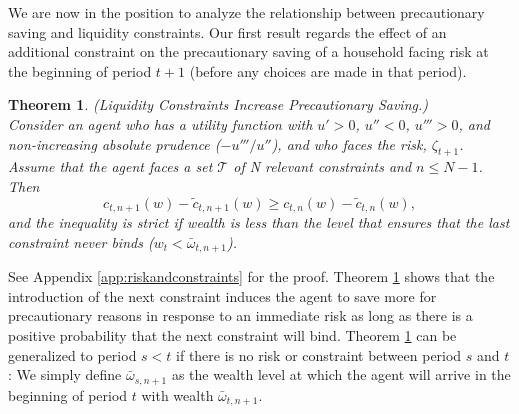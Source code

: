 \documentclass[titlepage]{\econtex}
\providecommand{\wAlt}{\omega}
\newtheorem{theorem}{Theorem}
\begin{document}
  We are now in the position to analyze the relationship between precautionary saving and liquidity constraints. Our first result regards the effect of an additional constraint on the precautionary saving of a household facing risk at the beginning of period $t+1$ (before any choices are made in that period).

  \begin{theorem}\label{thm:riskandconstraints} (Liquidity Constraints Increase Precautionary Saving.) \\
    Consider an agent who has a utility function with $u'> 0$, $u''< 0$, $u''' > 0$, and non-increasing absolute prudence ($-u'''/u''$), and who faces the risk, $\zeta_{t+1}$. Assume that the agent faces a set $\mathcal{T}$ of N relevant constraints and $n \leq N-1$. Then
    \begin{equation}
      c_{t,n+1}(w) - \tilde{c}_{t,n+1}(w) \geq c_{t,n}(w)-\tilde{c}_{t,n}(w), \label{eq:ineq}
    \end{equation}
    and the inequality is strict if wealth is less than the level that ensures that the last constraint never binds ($w_t < \bar{\wAlt}_{t,n+1}$).
  \end{theorem}

  \noindent See Appendix \ref{app:riskandconstraints} for the proof. Theorem \ref{thm:riskandconstraints} shows that the introduction of the next constraint induces the agent to save more for precautionary reasons in response to an immediate risk as long as there is a positive probability that the next constraint will bind. Theorem \ref{thm:riskandconstraints} can be generalized to period $s < t$ if there is no risk or constraint between period $s$ and $t$: We simply define $\bar{\wAlt}_{s,n+1}$ as the wealth level at which the agent will arrive in the beginning of period $t$ with wealth $\bar{\wAlt}_{t,n+1}$.
\end{document}
